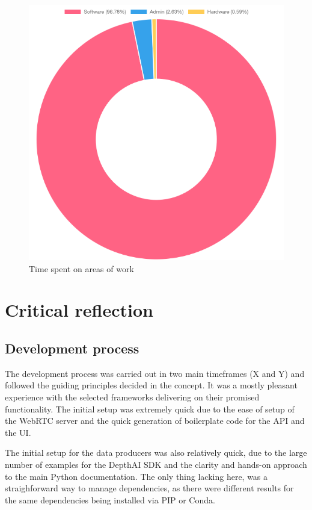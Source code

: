 \begin{figure}[h]
\centering
\includegraphics[scale=0.5]{04_Artefakte/01_Abbildungen/time-spent-on-types-of-work}
\caption[Time spent on areas of work]{Time spent on areas of work\protect}
\label{fig:timeSpentTypeOfWork}
\end{figure}

\section{Critical reflection}

\subsection{Development process}

The development process was carried out in two main timeframes (X and Y) and followed the guiding principles decided in the concept. It was a mostly pleasant experience with the selected frameworks delivering on their promised functionality. The initial setup was extremely quick due to the ease of setup of the WebRTC server and the quick generation of boilerplate code for the \ac{API} and the \ac{UI}.

The initial setup for the data producers was also relatively quick, due to the large number of examples for the DepthAI \ac{SDK} and the clarity and hands-on approach to the main Python documentation. The only thing lacking here, was a straighforward way to manage dependencies, as there were different results for the same dependencies being installed via PIP or Conda.

